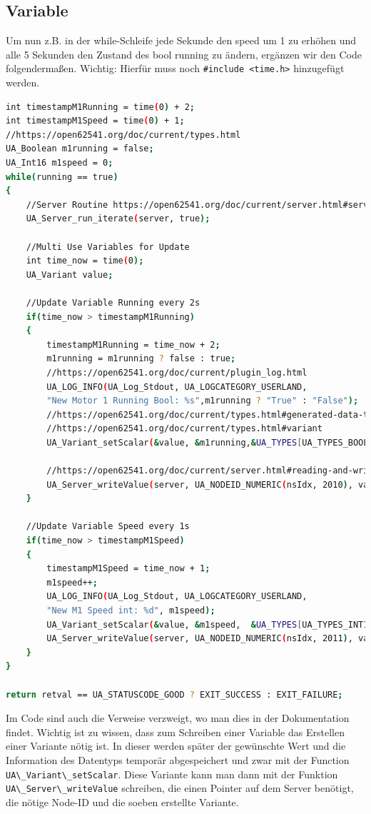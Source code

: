 \subsection{Variable}
Um nun z.B. in der while-Schleife jede Sekunde den speed um 1 zu erhöhen und alle 5 Sekunden den Zustand des bool running zu ändern, ergänzen wir den Code folgendermaßen.
Wichtig: Hierfür muss noch \lstinline|#include <time.h>| hinzugefügt werden.
\begin{lstlisting}[language=Bash]
int timestampM1Running = time(0) + 2;
int timestampM1Speed = time(0) + 1;
//https://open62541.org/doc/current/types.html
UA_Boolean m1running = false;
UA_Int16 m1speed = 0;
while(running == true)
{
	//Server Routine https://open62541.org/doc/current/server.html#server-lifecycle
	UA_Server_run_iterate(server, true);
	
	//Multi Use Variables for Update
	int time_now = time(0);
	UA_Variant value;
	
	//Update Variable Running every 2s
	if(time_now > timestampM1Running)
	{
		timestampM1Running = time_now + 2;
		m1running = m1running ? false : true;
		//https://open62541.org/doc/current/plugin_log.html
		UA_LOG_INFO(UA_Log_Stdout, UA_LOGCATEGORY_USERLAND,
		"New Motor 1 Running Bool: %s",m1running ? "True" : "False");
		//https://open62541.org/doc/current/types.html#generated-data-type-definitions
		//https://open62541.org/doc/current/types.html#variant
		UA_Variant_setScalar(&value, &m1running,&UA_TYPES[UA_TYPES_BOOLEAN]);
		
		//https://open62541.org/doc/current/server.html#reading-and-writing-node-attributes	
		UA_Server_writeValue(server, UA_NODEID_NUMERIC(nsIdx, 2010), val-ue);
	}
	
	//Update Variable Speed every 1s
	if(time_now > timestampM1Speed)
	{
		timestampM1Speed = time_now + 1;
		m1speed++;
		UA_LOG_INFO(UA_Log_Stdout, UA_LOGCATEGORY_USERLAND,
		"New M1 Speed int: %d", m1speed);
		UA_Variant_setScalar(&value, &m1speed,  &UA_TYPES[UA_TYPES_INT16]);
		UA_Server_writeValue(server, UA_NODEID_NUMERIC(nsIdx, 2011), val-ue);
	}
}

return retval == UA_STATUSCODE_GOOD ? EXIT_SUCCESS : EXIT_FAILURE;
\end{lstlisting}
Im Code sind auch die Verweise verzweigt, wo man dies in der Dokumentation findet. Wichtig ist zu wissen, dass zum Schreiben einer Variable das Erstellen einer Variante nötig ist. In dieser werden später der gewünschte Wert und die Information des Datentyps temporär abgespeichert und zwar mit der Function \lstinline|UA\_Variant\_setScalar|.
Diese Variante kann man dann mit der Funktion \lstinline|UA\_Server\_writeValue| schreiben,
die einen Pointer auf dem Server benötigt, die nötige Node-ID und die soeben erstellte Variante.

